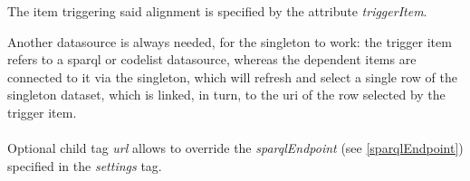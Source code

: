 The item triggering said alignment is specified by the attribute \textit{triggerItem}.

Another datasource is always needed, for the singleton to work: the trigger item refers to a sparql or codelist datasource, whereas the dependent items are connected to it via the singleton, which will refresh and select a single row of the singleton dataset, which is linked, in turn, to the uri of the row selected by the trigger item.
\\
\\
Optional child tag \textit{url} allows to override the \textit{sparqlEndpoint} (see \ref{sparqlEndpoint}) specified in the \textit{settings} tag.
\\


